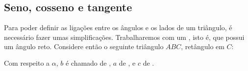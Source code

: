 \subsection{Seno, cosseno e tangente}
Para poder definir as ligações entre os ângulos e os lados de um triângulo, é necessário 
fazer umas simplificações. Trabalharemos com um , 
isto é, que possui um ângulo reto. Considere então o seguinte triângulo $ABC$, retângulo
em $C$:
\begin{center}
\begin{bmlimage}\end{bmlimage}
\end{center}
Com respeito a $\alpha$, $b$ é chamado de , $a$ de 
, e $c$ de .\\

